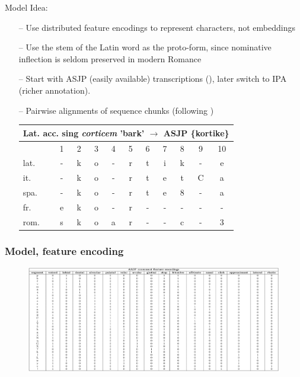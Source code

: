 \documentclass[10pt]{beamer}
\begin{document}
\begin{frame}{Model}
    Idea:
    \begin{itemize}
        \item[--] Use distributed feature encodings to represent characters, not embeddings
        \item[--] Use the stem of the Latin word as the proto-form, since nominative inflection is seldom preserved in modern Romance 
        \item[--] Start with ASJP (easily available) transcriptions (\cite{brown_automated_2008}), later switch to IPA (richer annotation).
        \item[--] Pairwise alignments of sequence chunks (following \cite{ciobanu_ab_2018}) \\
        \begin{center}
        \begin{tabular}{lcccccccccc}
            \hline
            \multicolumn{11}{c}{Lat. acc. sing \textit{corticem} 'bark' $\rightarrow$ ASJP \{kortike\}} \\
            \hline
            & 1 & 2 & 3 & 4 & 5 & 6 & 7 & 8 & 9 & 10 \\
            lat. & - & k & o & - & r & t & i & k & - & e \\
            it. & - & k & o & - & r & t & e & t & C & a \\
            spa. & - & k & o & - & r & t & e & 8 & - & a \\
            fr. & e & k & o & - & r & - & - & - & - & - \\
            rom. & s & k & o & a & r & - & - & c & - & 3  
        \end{tabular}
        \end{center}
    \end{itemize}
\end{frame}

\begin{frame}
    \frametitle{Model, feature encoding}
    \begin{figure}
        \centering
        \includegraphics[scale=.21]{graphics/asjp_cons.png}
    \end{figure} 
\end{frame}
\end{document}
